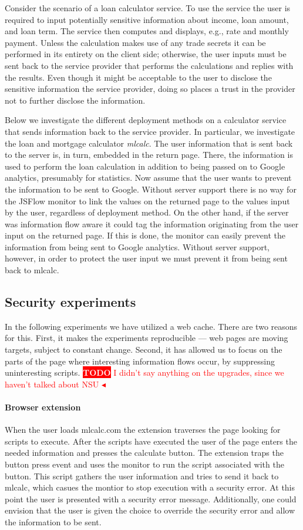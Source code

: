 \documentclass{llncs}
\newcommand{\todo}[1]{\colorbox{red}{\textcolor{white}{\sffamily\bfseries\scriptsize TODO}} \textcolor{red}{#1} \textcolor{red}{$\blacktriangleleft$}}
\begin{document}
Consider the scenario of a loan calculator service. To use the service the
user is required to input potentially sensitive information about income, 
loan amount, and loan term. The service then computes and displays, e.g., 
rate and monthly payment. Unless the calculation makes use of any trade secrets
it can be performed in its entirety on the client side; otherwise, the
user inputs must be sent back to the service provider that performs the
calculations and replies with the results. Even though it might be acceptable to 
the user to disclose the sensitive information the service provider,
doing so places a trust in the provider not to further disclose the information.

Below we investigate the different deployment methods on a calculator service
that sends information back to the service provider. In particular, we
investigate the loan and mortgage calculator \emph{mlcalc}. The user
information that is sent back to the server is, in turn, embedded in the return
page. There, the information is used to perform the loan calculation in
addition to being passed on to Google analytics, presumably for statistics. Now
assume that the user wants to prevent the information to be sent to Google.
Without server support there is no way for the JSFlow monitor to link the
values on the returned page to the values input by the user, regardless of
deployment method. On the other hand, if the server was information flow aware
it could tag the information originating from the user input on the returned
page. If this is done, the monitor can easily prevent the information from
being sent to Google analytics. Without server support, however, in order to
protect the user input we must prevent it from being sent back to mlcalc. 

\subsection{Security experiments}
In the following experiments we have utilized a web cache. There are two
reasons for this. First, it makes the experiments reproducible --- web pages 
are moving targets, subject to constant change. Second, it has allowed us
to focus on the parts of the page where interesting information flows occur,
by suppressing uninteresting scripts.
\todo{I didn't say anything on the upgrades, since we haven't talked about NSU}

\paragraph{Browser extension}
When the user loads mlcalc.com the extension traverses the page looking for
scripts to execute. After the scripts have executed the user of the page
enters the needed information and presses the calculate button. The extension
traps the button press event and uses the monitor to run the script associated
with the button. This script gathers the user information and tries to send
it back to mlcalc, which casues the montior to stop execution with a security 
error. At this point the user is presented with a security error message. 
Additionally, one could envision that the user is given the choice to
override the security error and allow the information to be sent.
\end{document}

